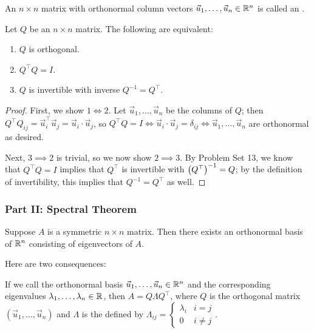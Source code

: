 \documentclass[main.tex]{subfiles}
\begin{document}
\begin{definition}
    An $n\times n$ matrix with orthonormal column vectors $\vec{u}_1, \ldots , \vec{u}_n\in \mathbb R^n$ is called an .
\end{definition}

\begin{proposition}
    Let $Q$ be an $n\times n$ matrix. The following are equivalent:
    \begin{enumerate}
        \item $Q$ is orthogonal.
        \item $Q^\top Q = I$.
        \item $Q$ is invertible with inverse $Q^{-1} = Q^\top$.
    \end{enumerate}
\end{proposition}

\begin{proof}
    First, we show $1\iff 2$. Let $\vec{u}_1, \ldots , \vec{u}_n$ be the columns of $Q$; then $Q^\top Q_{ij} = \vec{u}_i^\top \vec{u}_j = \vec{u}_i\cdot \vec{u}_j$, so $Q^\top Q = I\iff \vec{u}_i\cdot\vec{u}_j = \delta_{ij}\iff \vec{u}_1, \ldots , \vec{u}_n$ are orthonormal as desired.

    Next, $3 \implies 2$ is trivial, so we now show $2\implies 3$. By Problem Set 13, we know that $Q^\top Q = I$ implies that $Q^\top$ is invertible with $\left( Q^\top \right)^{-1} = Q$; by the definition of invertibility, this implies that $Q^{-1} = Q^\top$ as well.
\end{proof}

\subsubsection{Part II: Spectral Theorem}

\begin{theorem}
    Suppose $A$ is a symmetric $n\times n$ matrix. Then there exists an orthonormal basis of $\mathbb R^n$ consisting of eigenvectors of $A$.
\end{theorem}

Here are two consequences:
\begin{corollary}
    If we call the orthonormal basis $\vec{u}_1, \ldots , \vec{u}_n\in \mathbb R^n$ and the corresponding eigenvalues $\lambda_1, \ldots , \lambda_n\in \mathbb R$, then $A = Q\Lambda Q^\top$, where $Q$ is the orthogonal matrix $(\vec{u}_1, \ldots , \vec{u}_n)$ and $\Lambda$ is the  defined by $\Lambda_{ij} = \begin{cases}
        \lambda_i & i = j \\
        0 & i \neq j
    \end{cases}$.
\end{corollary}
\end{document}
